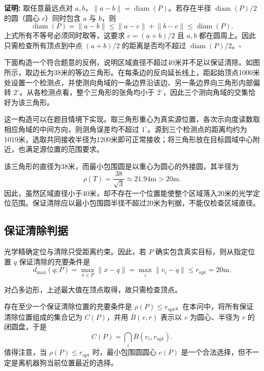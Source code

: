 \documentclass[UTF8,a4paper,zihao=-4,fontset=none]{ctexart}
\begin{document}
\textbf{证明: } 取任意最远点对 \(a,b\)，\(\lVert a-b\rVert=\operatorname{diam}(P)\)。若存在半径 \(\operatorname{diam}(P)/2\) 的圆（圆心 \(c\)）同时包含 \(a\) 与 \(b\)，则
\begin{equation}
  \operatorname{diam}(P)=\lVert a-b\rVert\le\lVert a-c\rVert+\lVert b-c\rVert\le\operatorname{diam}(P) .
\end{equation}
上式所有不等号必须同时取等，这要求 \(c=(a+b)/2\) 且 \(a,b\) 都在圆周上。因此只需检查所有顶点到中点 \((a+b)/2\) 的距离是否均不超过 \(\operatorname{diam}(P)/2\)。\(\square\)

下面构造一个符合题意的反例，说明区域直径不超过40米并不足以保证清除。如图所示，取边长为38米的等边三角形。在每条边的反向延长线上，距起始顶点1000米处设置一个检测点，并使测向角域的一条边界沿该边、另一条边界向三角形内部偏转 \(2^\circ\)。从各检测点看，整个三角形的张角均小于 \(2^\circ\)，因此三个测向角域的交集恰好为该三角形。

这一构造可以在题目情境下实现。取三角形重心为真实源位置，各次示向度读数取相应角域的中间方向，则测角误差均不超过 \(1^\circ\)。源到三个检测点的距离均约为1019米，选取共同接收半径为1200米即可正常接收；将三角形放在目标圆域中心附近，也满足源位置的范围要求。

该三角形的直径为38米，而最小包围圆是以重心为圆心的外接圆，其半径为
\begin{equation}
  \rho(T)=\frac{38}{\sqrt{3}}\approx21.94\mathrm{m}>20\mathrm{m}.
  \label{eq:counterexample}
\end{equation}
因此，虽然区域直径小于40米，却不存在一个位置能使整个区域落入20米的光学定位范围。保证清除应以最小包围圆半径不超过20米为判据，不能仅检查区域直径。

\subsection{保证清除判据}

光学精确定位与清除只受距离约束。因此，若 \(P\) 确实包含真实目标，则从指定位置 \(q\) 保证清除的充要条件是
\begin{equation}
  d_{\max}(q;P)=\max_{x\in P}\lVert x-q\rVert=\max_i\lVert v_i-q\rVert\le r_{\mathrm{opt}} =20\mathrm{m}.
  \label{eq:clear-condition}
\end{equation}

对凸多边形，上述最大值在顶点取得，故只需检查顶点。

存在至少一个保证清除位置的充要条件是 \(\rho(P)\le r_{\mathrm{opt}}\)。在本问中，将所有保证清除位置组成的集合记为 \(C(P)\)，并用 \(\overline B(v,r)\) 表示以 \(v\) 为圆心、半径为 \(r\) 的闭圆盘，于是
\begin{equation}
  C(P)=\bigcap_i\overline{B}(v_i,r_{\mathrm{opt}}).
  \label{eq:clear-set}
\end{equation}
值得注意，当 \(\rho(P)\le r_{\mathrm{opt}}\) 时，最小包围圆圆心 \(c(P)\) 是一个合法选择，但不一定是离机器狗当前位置最近的选择。
\end{document}
